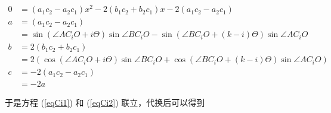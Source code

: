 \documentclass{ctexart}
\begin{document}
\begin{align*}
0&=(a_1c_2 - a_2c_1)x^2-2(b_1c_2+b_2c_1)x -2(a_1c_2 - a_2c_1)\\
a &= (a_1c_2 - a_2c_1)\\
&= \sin(\angle AC_iO + i\Theta)\sin\angle BC_iO - \sin (\angle BC_iO + (k - i)\Theta)\sin\angle AC_iO\\
b &= 2(b_1c_2+b_2c_1) \\
& = 2(\cos(\angle AC_iO + i\Theta)\sin\angle BC_iO+\cos  (\angle BC_iO + (k - i)\Theta)\sin\angle AC_iO) \\
c &= -2(a_1c_2 - a_2c_1)\\
 &= -2a
\end{align*}

于是方程 (\ref{eqCi1}) 和 (\ref{eqCi2}) 联立，代换后可以得到
\end{document}
